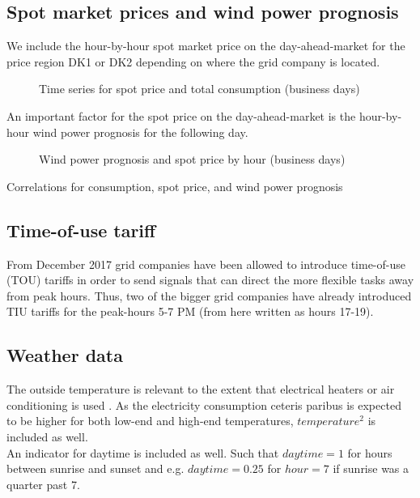 \subsection{Spot market prices and wind power prognosis}
\label{subsec:d_spot}
We include the hour-by-hour spot market price on the day-ahead-market for the price region DK1 or DK2 depending on where the grid company is located.

\begin{figure}[H]
  \centering
  \caption{Time series for spot price and total consumption (business days)}
  \label{fig:price_cons_time_series}
\end{figure}
An important factor for the spot price on the day-ahead-market is the hour-by-hour wind power prognosis for the following day.
\begin{figure}[H]
  \centering
  \caption{Wind power prognosis and spot price by hour (business days)}
  \label{fig:wp_price_hour}
\end{figure}


\begin{table}[H]
  \centering
  \caption{Correlations for consumption, spot price, and wind power prognosis}
  \footnotesize
  \label{tab:correlations}
\end{table}


\subsection{Time-of-use tariff}
\label{subsec:d_tout}
From December 2017 grid companies have been allowed to introduce time-of-use (TOU) tariffs in order to send signals that can direct the more flexible tasks away from peak hours. Thus, two of the bigger grid companies have already introduced TIU tariffs for the peak-hours 5-7 PM (from here written as hours 17-19).

\subsection{Weather data}
\label{subsec:d_weather}
The outside temperature is relevant to the extent that electrical heaters or air conditioning is used \citep{lijesen2007real, vesterberg2014residential}. As the electricity consumption ceteris paribus is expected to be higher for both low-end and high-end temperatures, $temperature^2$ is included as well.
\medskip\\
An indicator for daytime is included as well. Such that $daytime=1$ for hours between sunrise and sunset and e.g. $daytime=0.25$ for $hour=7$ if sunrise was a quarter past 7.

